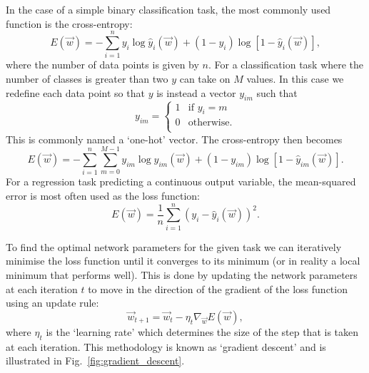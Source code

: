In the case of a simple binary classification task, the most commonly used function is the
cross-entropy:
\begin{equation} %
    E(\vec{w})=
    -\displaystyle\sum_{i=1}^{n}y_{i}\log\hat{y}_{i}(\vec{w})+
    (1-y_{i})\log[1-\hat{y}_{i}(\vec{w})],
    \label{eq:binary_cross_entropy}
\end{equation}
where the number of data points is given by $n$. For a classification task where the number of
classes is greater than two $y$ can take on $M$ values. In this case we redefine each data point
so that $y$ is instead a vector $y_{im}$ such that
\begin{equation} %
    y_{im}=
    \begin{cases}
        1 & \text{if $y_{i}=m$} \\
        0 & \text{otherwise.}   \\
    \end{cases}
\end{equation}
This is commonly named a `one-hot' vector. The cross-entropy then becomes
\begin{equation} %
    E(\vec{w})=
    -\displaystyle\sum_{i=1}^{n}\displaystyle\sum_{m=0}^{M-1}y_{im}\log\hat{y}_{im}
    (\vec{w})+(1-y_{im})\log[1-\hat{y}_{im}(\vec{w})].
    \label{eq:categorical_cross_entropy}
\end{equation}
For a regression task predicting a continuous output variable, the mean-squared error is most
often used as the loss function:
\begin{equation} %
    E(\vec{w})=
    \frac{1}{n}\displaystyle\sum_{i=1}^{n}(y_{i}-
    \hat{y}_{i}(\vec{w}))^{2}.
    \label{eq:mse}
\end{equation}

To find the optimal network parameters for the given task we can iteratively minimise the loss
function until it converges to its minimum (or in reality a local minimum that performs well).
This is done by updating the network parameters at each iteration $t$ to move in the direction of
the gradient of the loss function using an update rule:
\begin{equation} %
    \vec{w}_{t+1}=\vec{w}_{t}-\eta_{t}\nabla_{\vec{w}}E(\vec{w}),
\end{equation}
where $\eta_{t}$ is the `learning rate' which determines the size of the step that is taken at
each iteration. This methodology is known as `gradient descent' and is illustrated in
Fig.~\ref{fig:gradient_descent}.

